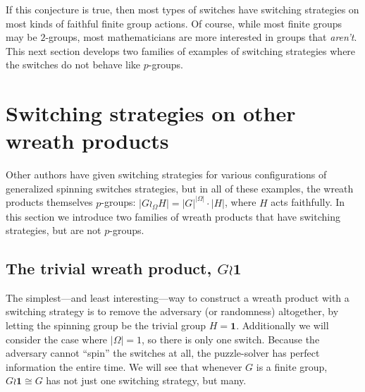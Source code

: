 If this conjecture is true, then most types of switches have switching
strategies on most kinds of faithful finite group actions.
Of course, while most finite groups may be $2$-groups, most mathematicians
are more interested in groups that \textit{aren't}.
This next section develops two families of examples of switching strategies
where the switches do not behave like $p$-groups.

%
%
\section{Switching strategies on other wreath products}
\label{sec:OtherSwitchingStrategies}

Other authors have given switching strategies for various configurations of
generalized spinning switches strategies, but in all of these examples,
the wreath products themselves $p$-groups:
$|G \wr_\Omega H| = |G|^{|\Omega|} \cdot |H|$, where $H$ acts faithfully.
In this section we introduce two families of wreath products that have switching
strategies, but are not $p$-groups.

\subsection{The trivial wreath product, \texorpdfstring{$G \wr \mathbf{1}$}{G wreath trivial group}}
The simplest---and least interesting---way to construct a wreath product with
a switching strategy is to remove the adversary (or randomness) altogether,
by letting the spinning group be the trivial group $H = \mathbf{1}$.
Additionally we will consider the case where $|\Omega| = 1$, so there is only
one switch.
Because the adversary cannot ``spin'' the switches at all, the puzzle-solver has
perfect information the entire time.
We will see that whenever $G$ is a finite group,
$G \wr \mathbf{1} \cong G$ has not just one switching strategy, but many.

